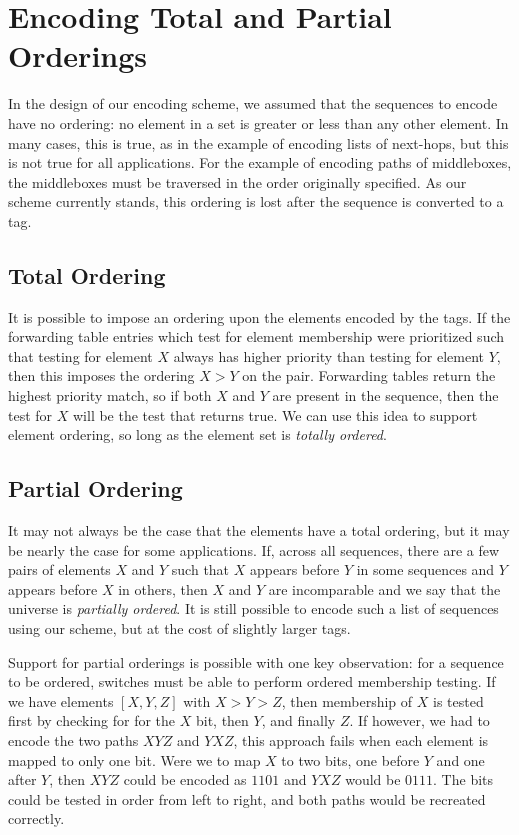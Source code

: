 \section{Encoding Total and Partial Orderings}
In the design of our encoding scheme, we assumed that the sequences to encode have no ordering: no element in a set is greater or less than any other element. In many cases, this is true, as in the example of encoding lists of next-hops, but this is not true for all applications. For the example of encoding paths of middleboxes, the middleboxes must be traversed in the order originally specified. As our scheme currently stands, this ordering is lost after the sequence is converted to a tag. 

\subsection{Total Ordering}
It is possible to impose an ordering upon the elements encoded by the tags. If the forwarding table entries which test for element membership were prioritized such that testing for element $X$ always has higher priority than testing for element $Y$, then this imposes the ordering $X > Y$ on the pair. Forwarding tables return the highest priority match, so if both $X$ and $Y$ are present in the sequence, then the test for $X$ will be the test that returns true. We can use this idea to support element ordering, so long as the element set is \textit{totally ordered}.

\subsection{Partial Ordering}
It may not always be the case that the elements have a total ordering, but it may be nearly the case for some applications. If, across all sequences, there are a few pairs of elements $X$ and $Y$ such that $X$ appears before $Y$ in some sequences and $Y$ appears before $X$ in others, then $X$ and $Y$ are incomparable and we say that the universe is \textit{partially ordered}. It is still possible to encode such a list of sequences using our scheme, but at the cost of slightly larger tags.

Support for partial orderings is possible with one key observation: for a sequence to be ordered, switches must be able to perform ordered membership testing. If we have elements $[X,Y,Z]$ with $X > Y > Z$, then membership of $X$ is tested first by checking for for the $X$ bit, then $Y$, and finally $Z$. If however, we had to encode the two paths $XYZ$ and $YXZ$, this approach fails when each element is mapped to only one bit. Were we to map $X$ to two bits, one before $Y$ and one after $Y$, then $XYZ$ could be encoded as $1101$ and $YXZ$ would be $0111$. The bits could be tested in order from left to right, and both paths would be recreated correctly. 

